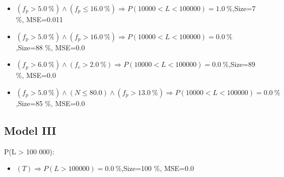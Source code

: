 \documentclass[numbered]{CSL}
\begin{document}
\begin{itemize}
\item $(f_p > 5.0~\%) \land (f_p \leq 16.0~\%) \Rightarrow P(10 000 < L < 100 000) = 1.0~\%$,\hfill Size=7 \%, MSE=0.011
\item $(f_p > 5.0~\%) \land (f_p > 16.0~\%) \Rightarrow P(10 000 < L < 100 000) = 0.0~\%$,\hfill Size=88 \%, MSE=0.0
\item $(f_p > 6.0~\%) \land (f_c > 2.0~\%) \Rightarrow P(10 000 < L < 100 000) = 0.0~\%$,\hfill Size=89 \%, MSE=0.0
\item $(f_p > 5.0~\%) \land (N \leq 80.0) \land (f_p > 13.0~\%) \Rightarrow P(10 000 < L < 100 000) = 0.0~\%$,\hfill Size=85 \%, MSE=0.0
\end{itemize}

\subsection{Model III}
P(L > 100 000):
\begin{itemize}
\item $(T) \Rightarrow P(L > 100 000) = 0.0~\%$,\hfill Size=100 \%, MSE=0.0
\end{itemize}
\end{document}
